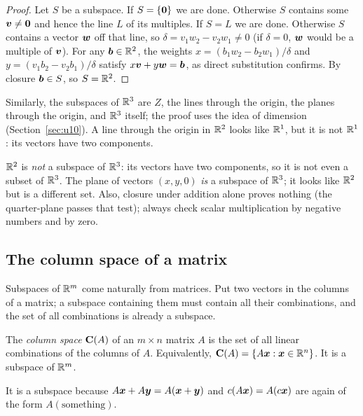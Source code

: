 \begin{proof}
Let $S$ be a subspace. If $S=\{\boldsymbol{0}\}$ we are done. Otherwise $S$ contains some
$\boldsymbol{v}\neq\boldsymbol{0}$ and hence the line $L$ of its multiples. If $S=L$ we are done. Otherwise $S$
contains a vector $\boldsymbol{w}$ off that line, so $\delta=v_1w_2-v_2w_1\neq0$ (if $\delta=0$, $\boldsymbol{w}$
would be a multiple of $\boldsymbol{v}$). For any $\boldsymbol{b}\in\mathbb{R}^2$, the weights
$x=(b_1w_2-b_2w_1)/\delta$ and $y=(v_1b_2-v_2b_1)/\delta$ satisfy $x\boldsymbol{v}+y\boldsymbol{w}=\boldsymbol{b}$, as
direct substitution confirms. By closure $\boldsymbol{b}\in S$, so $S=\mathbb{R}^2$.
\end{proof}

Similarly, the subspaces of $\mathbb{R}^3$ are $Z$, the lines through the origin, the planes through
the origin, and $\mathbb{R}^3$ itself; the proof uses the idea of dimension
(Section~\ref{sec:u10}). A line through the origin in $\mathbb{R}^2$ looks like $\mathbb{R}^1$, but it is not
$\mathbb{R}^1$: its vectors have two components.

\begin{trap}
$\mathbb{R}^2$ is \emph{not} a subspace of $\mathbb{R}^3$: its vectors have two components, so it is not
even a subset of $\mathbb{R}^3$. The plane of vectors $(x,y,0)$ \emph{is} a subspace of $\mathbb{R}^3$; it
looks like $\mathbb{R}^2$ but is a different set. Also, closure under addition alone proves
nothing (the quarter-plane passes that test); always check scalar multiplication by negative
numbers and by zero.
\end{trap}

\subsection{The column space of a matrix}

Subspaces of $\mathbb{R}^m$ come naturally from matrices. Put two vectors in the columns of a matrix;
a subspace containing them must contain all their combinations, and the set of all
combinations is already a subspace.

\begin{definition}\label{def:u06-colspace}
The \emph{column space} $\mathbf{C}(A)$ of an $m\times n$ matrix $A$ is the set of all linear
combinations of the columns of $A$. Equivalently, $\mathbf{C}(A)=\{A\boldsymbol{x}:\boldsymbol{x}\in\mathbb{R}^n\}$. It is a
subspace of $\mathbb{R}^m$.
\end{definition}

It is a subspace because $A\boldsymbol{x}+A\boldsymbol{y}=A(\boldsymbol{x}+\boldsymbol{y})$ and $c(A\boldsymbol{x})=A(c\boldsymbol{x})$ are again
of the form $A(\text{something})$.

